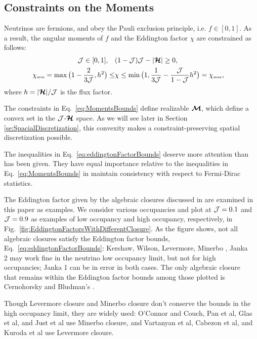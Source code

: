 \subsection{Constraints on the Moments}
Neutrinos are fermions, and obey the Pauli exclusion principle, i.e. $f \in [0,1]$.
As a result, the angular moments of $f$ and the Eddington factor $\chi$ are constrained as follows\cite{levermore_1984,lareckiBanach_2011,kershaw_1976,shohatTamarkin_1943}: 
\begin{align}
\mathcal{J} \in[0,1], \quad &(1-\mathcal{J})\mathcal{J}-|\boldsymbol{\mathcal{H}}| \geq 0, \label{eq:MomentsBounds}\\
  \chi_{\mbox{\tiny min}}
  =\max\big(1-\frac{2}{3\mathcal{J}},h^{2}\big)
  \leq & \chi \leq \min\big(1,\frac{1}{3\mathcal{J}}-\frac{\mathcal{J}}{1-\mathcal{J}}h^{2}\big)=\chi_{\mbox{\tiny max}},
  \label{eq:eddingtonFactorBounds}
\end{align}
where $h = |\boldsymbol{\mathcal{H}}|/\mathcal{J}$ is the flux factor.

The constraints in Eq.~\eqref{eq:MomentsBounds} define realizable $\boldsymbol{\mathcal{M}}$, which define a convex set in the $\mathcal{J}$-$\boldsymbol{\mathcal{H}}$ space.
As we will see later in Section \ref{se:SpacialDiscretization}, this convexity makes a constraint-preserving spatial discretization possible.

The inequalities in Eq.~\eqref{eq:eddingtonFactorBounds} deserve more attention than has been given.
They have equal importance relative to the inequalities in Eq.~\eqref{eq:MomentsBounds} in maintain consistency with respect to Fermi-Dirac statistics.

The Eddington factor given by the algebraic closures discussed in \cite{murchikova_etal_2017} are examined in this paper as examples.
We consider various occupancies and plot at $\mathcal{J} = 0.1$ and $\mathcal{J} = 0.9$ as examples of low occupancy and high occupancy, respectively, in Fig.~\eqref{fig:EddingtonFactorsWithDifferentClosure}.  
As the figure shows, not all algebraic closures satisfy the Eddington factor bounds, Eq.~\eqref{eq:eddingtonFactorBounds}: Kershaw\cite{kershaw_1976}, Wilson\cite{wilson_1975,leblancWilson_1970}, Levermore\cite{levermore_1984}, Minerbo \cite{minerbo_1978}, Janka 2\cite{janka_1992} may work fine in the neutrino low occupancy limit, but not for high occupancies; Janka 1\cite{janka_1991} can be in error in both cases.
The only algebraic closure that remains within the Eddington factor bounds among those plotted is Cernohorsky and Bludman's \cite{cernohorskyBludman_1994}.

Though Levermore closure and Minerbo closure don't conserve the bounds in the high occupancy limit, they are widely used: {O'Connor} and {Couch}\cite{oConnorCouch_2018}, Pan et al\cite{pan_etal_2018}, Glas et al\cite{glas_etal_2018}, and Just et al\cite{just_etal_2018} use Minerbo closure, and Vartanyan et al\cite{vartanyan_etal_2018}, Cabezon et al\cite{cabezon_etal_2018}, and Kuroda et al\cite{kuroda_etal_2016} use Levermore clsoure.

